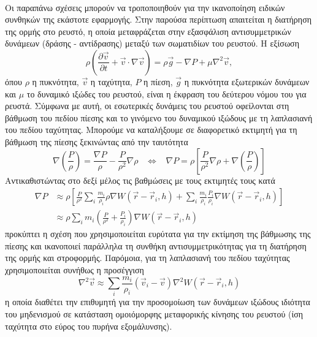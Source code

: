 \paragraph{} Οι παραπάνω σχέσεις μπορούν να τροποποιηθούν για την ικανοποίηση ειδικών
συνθηκών της εκάστοτε εφαρμογής. Στην παρούσα περίπτωση απαιτείται η διατήρηση της ορμής
στο ρευστό, η οποία μεταφράζεται στην εξασφάλιση αντισυμμετρικών δυνάμεων (δράσης -
αντίδρασης) μεταξύ των σωματιδίων του ρευστού. Η εξίσωση 
\begin{equation}
  \label{eq:navier-stokes}
  \rho \left( \frac{\partial \vec{v}}{\partial t} + \vec{v} \cdot \nabla \vec{v} \right) =
  \rho \vec{g} - \nabla P + \mu \nabla^2 \vec{v},
\end{equation}
όπου $\rho$
η πυκνότητα, $\vec{v}$
η ταχύτητα, $P$
η πίεση, $\vec{g}$
η πυκνότητα εξωτερικών δυνάμεων και $\mu$
το δυναμικό ιξώδες του ρευστού, είναι η έκφραση του δεύτερου νόμου του  για
ρευστά. Σύμφωνα με αυτή, οι εσωτερικές δυνάμεις του ρευστού οφείλονται στη βάθμωση του
πεδίου πίεσης και το γινόμενο του δυναμικού ιξώδους με τη λαπλασιανή του πεδίου
ταχύτητας. Μπορούμε να καταλήξουμε σε διαφορετικό εκτιμητή για τη βάθμωση της πίεσης
ξεκινώντας από την ταυτότητα
\begin{equation*}
  \label{eq:grad-identity}
  \nabla \left( \frac{P}{\rho} \right) =
  \frac{\nabla P}{\rho}-
  \frac{P}{\rho^2} \nabla \rho
  \hspace{10pt} \Leftrightarrow \hspace{10pt}
  \nabla P = \rho \left[ \frac{P}{\rho^2} \nabla \rho + \nabla \left( \frac{P}{\rho}
    \right) \right]
\end{equation*}
Αντικαθιστώντας στο δεξί μέλος τις βαθμώσεις με τους εκτιμητές τους κατά 
\begin{align}
  \label{eq:grad-est}
  \nabla P &\approx \rho \left[ \frac{P}{\rho^2} \sum_i \frac{m_i}{\rho_i} \rho \nabla
             W(\vec{r}-\vec{r}_i, h)
             +
             \sum_i \frac{m_i}{\rho_i} \frac{P_i}{\rho_i} \nabla W(\vec{r}-\vec{r}_i, h)
             \right] \nonumber \\
           &\approx\rho \sum_i m_i \left(\frac{P}{\rho^2} + \frac{P_i}{\rho_i} \right)
             \nabla W(\vec{r}-\vec{r}_i, h)
\end{align}
προκύπτει η σχέση που χρησιμοποιείται ευρύτατα για την εκτίμηση της βάθμωσης της πίεσης
και ικανοποιεί παράλληλα τη συνθήκη αντισυμμετρικότητας για τη διατήρηση της ορμής και
στροφορμής. Παρόμοια, για τη λαπλασιανή του πεδίου ταχύτητας χρησιμοποιείται συνήθως η
προσέγγιση
\begin{equation}
  \label{eq:lapl-est}
  \nabla^2\vec{v} \approx \sum_i \frac{m_i}{\rho_i} (\vec{v}_i - \vec{v}) \nabla^2
  W(\vec{r}-\vec{r}_i, h)
\end{equation}
η οποία διαθέτει την επιθυμητή για την προσομοίωση των δυνάμεων ιξώδους ιδιότητα του
μηδενισμού σε κατάσταση ομοιόμορφης μεταφορικής κίνησης του ρευστού (ίση ταχύτητα στο
εύρος του πυρήνα εξομάλυνσης).

